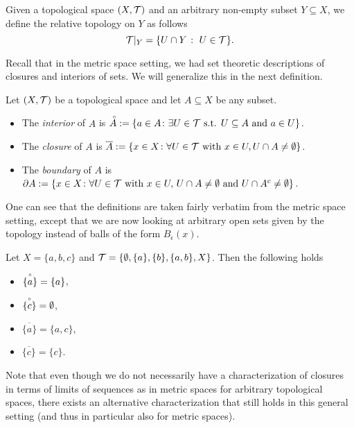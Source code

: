 \documentclass{article}
\begin{document}
\begin{definition}
Given a topological space $(X,\mathcal{T})$ and an arbitrary non-empty subset $Y \subseteq X$, we define the relative topology on $Y$ as follows
\begin{equation*}
    \mathcal{T}\vert_Y = \{U\cap Y \; \colon\; U \in \mathcal{T}\}.
\end{equation*}
\end{definition}

Recall that in the metric space setting, we had set theoretic descriptions of closures and interiors of sets. We will generalize this in the next definition. 

\begin{definition}
Let $(X,\mathcal{T})$ be a topological space and let $A\subseteq X$ be any subset.
\begin{itemize}
    \item The \emph{interior} of $A$ is $\accentset{\circ} A := \{a \in A \colon \exists U \in  \mathcal{T} \text{ s.t. } U\subseteq A \text{ and } a\in U\} $.
    \item The \emph{closure} of $A$ is $\overline{A} := \{x \in X \colon \forall U \in \mathcal{T} \text{ with } x \in U, U\cap A \neq \emptyset\}$.
    \item The \emph{boundary} of $A$ is $\partial A:= \{x \in X \colon \forall U\in \mathcal{T} \text{ with } x\in U, \, U \cap A \neq \emptyset \text{ and } U \cap A^c \neq \emptyset \}$.
\end{itemize}
\end{definition}
One can see that the definitions are taken fairly verbatim from the metric space setting, except that we are now looking at arbitrary open sets given by the topology instead of balls of the form $B_\epsilon(x)$.  

\begin{example}
Let $X=\{a,b,c\}$ and $\mathcal{T} = \{\emptyset ,\{a\}, \{b\},\{a,b\}, X\}$. Then the following holds
\begin{itemize}
    \item $ \accentset{\circ}{\{ a\} }= \{a\}$,
    \item $\accentset{\circ}{ \{c\}} = \emptyset$,
    \item $\overline{\{a\}} = \{a,c\}$,
    \item $\overline{\{c\}} = \{c\}$.
\end{itemize}
\end{example}

Note that even though we do not necessarily have a characterization of closures in terms of limits of sequences as in metric spaces for arbitrary topological spaces, there exists an alternative characterization that still holds in this general setting (and thus in particular also for metric spaces).
\end{document}
